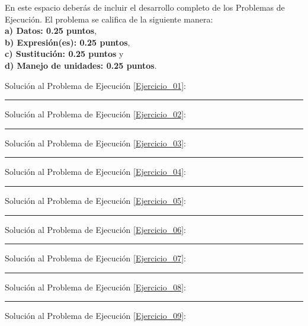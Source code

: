 \documentclass[12pt, letter]{exam}
\begin{document}
\newpage

En este espacio deberás de incluir el desarrollo completo de los Problemas de Ejecución. El problema se califica de la siguiente manera: \\
\textbf{a) Datos: 0.25 puntos}, \\
\textbf{b) Expresión(es): 0.25 puntos}, \\
\textbf{c) Sustitución: 0.25 puntos} y \\
\textbf{d) Manejo de unidades: 0.25 puntos}.

\vspace*{0.5cm}

Solución al Problema de Ejecución \ref{Ejercicio_01}:

\vspace*{3.5cm}
\rule{0.9\textwidth}{0.3mm}

Solución al Problema de Ejecución \ref{Ejercicio_02}:

\vspace*{3.5cm}
\rule{0.9\textwidth}{0.3mm}

Solución al Problema de Ejecución \ref{Ejercicio_03}:

\vspace*{3.5cm}
\rule{0.9\textwidth}{0.3mm}

Solución al Problema de Ejecución \ref{Ejercicio_04}:

\vspace*{3.5cm}
\rule{0.9\textwidth}{0.3mm}



Solución al Problema de Ejecución \ref{Ejercicio_05}: 

\vspace*{3.5cm}
\rule{0.9\textwidth}{0.3mm}

Solución al Problema de Ejecución \ref{Ejercicio_06}:

\vspace*{3.5cm}
\rule{0.9\textwidth}{0.3mm}

Solución al Problema de Ejecución \ref{Ejercicio_07}:

\vspace*{3.5cm}
\rule{0.9\textwidth}{0.3mm}

Solución al Problema de Ejecución \ref{Ejercicio_08}:

\vspace*{3.5cm}
\rule{0.9\textwidth}{0.3mm}

Solución al Problema de Ejecución \ref{Ejercicio_09}:
\end{document}
